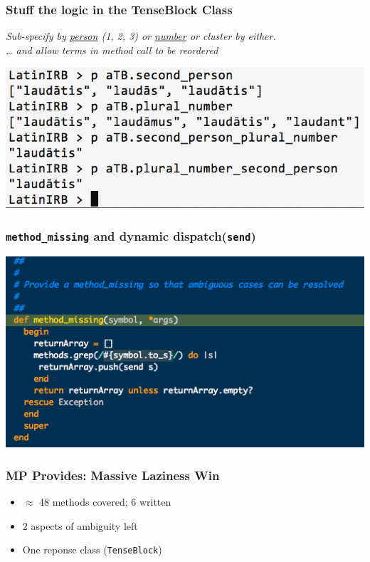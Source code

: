 \documentclass[slidestop,compress,mathserif]{beamer}
\begin{document}
\begin{frame}
	\frametitle{Stuff the logic in the TenseBlock Class}
	\emph{
		Sub-specify by \underline{person} (1, 2, 3) or \underline{number} or
    cluster by either. \\
		\pause
		{\ldots} and allow terms in method call to be reordered
  }
	\vskip 0.5cm
	\begin{center}
		\includegraphics[scale=0.38]{img/conj_subspec.png}
	\end{center}
\end{frame}

\begin{frame}
	\frametitle{\texttt{method\_missing} and dynamic dispatch(\texttt{send})}
	\includegraphics[scale=0.55]{img/tenseblock_mm.png}
\end{frame}

\begin{frame}
	\frametitle{MP Provides:  Massive Laziness Win}
	\begin{itemize}
		\item $\approx$ 48 methods covered; 6 written
		\pause
		\item 2 aspects of ambiguity left
		\pause
		\item One reponse class (\texttt{TenseBlock})
	\end{itemize}
\end{frame}
\end{document}
